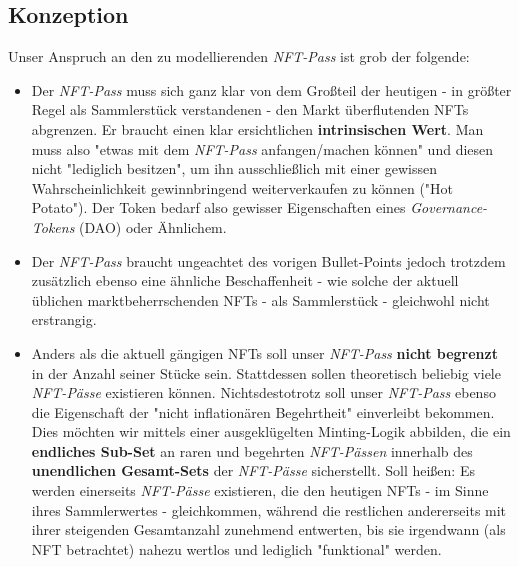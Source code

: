 
\subsection{Konzeption}

\vspace{0.3cm}

Unser Anspruch an den zu modellierenden \textit{NFT-Pass} ist grob der folgende:

\vspace{0.2cm}

\begin{itemize}
  \item Der \textit{NFT-Pass} muss sich ganz klar von dem Großteil der heutigen - in größter Regel als Sammlerstück verstandenen - den Markt überflutenden NFTs abgrenzen. Er braucht einen klar ersichtlichen \textbf{intrinsischen Wert}. Man muss also "etwas mit dem \textit{NFT-Pass} anfangen/machen können" und diesen nicht "lediglich besitzen", um ihn ausschließlich mit einer gewissen Wahrscheinlichkeit gewinnbringend weiterverkaufen zu können ("Hot Potato"). Der Token bedarf also gewisser Eigenschaften eines \textit{Governance-Tokens} (DAO) oder Ähnlichem.
  \item 
  \begin{sloppypar}  
  Der \textit{NFT-Pass} braucht ungeachtet des vorigen Bullet-Points jedoch trotzdem zusätzlich ebenso eine ähnliche Beschaffenheit - wie solche der aktuell üblichen marktbeherrschenden NFTs - als Sammlerstück - gleichwohl nicht erstrangig. 
  \end{sloppypar}
  \item Anders als die aktuell gängigen NFTs soll unser \textit{NFT-Pass} \textbf{nicht begrenzt} in der Anzahl seiner Stücke sein. Stattdessen sollen theoretisch beliebig viele \textit{NFT-Pässe} existieren können. Nichtsdestotrotz soll unser \textit{NFT-Pass} ebenso die Eigenschaft der "nicht inflationären Begehrtheit" einverleibt bekommen. Dies möchten wir mittels einer ausgeklügelten Minting-Logik abbilden, die ein \textbf{endliches Sub-Set} an raren und begehrten \textit{NFT-Pässen} innerhalb des \textbf{unendlichen Gesamt-Sets} der \textit{NFT-Pässe} sicherstellt. Soll heißen: Es werden einerseits \textit{NFT-Pässe} exis\-tieren, die den heutigen NFTs - im Sinne ihres Sammlerwertes - gleichkommen, während die restlichen andererseits mit ihrer steigenden Gesamtanzahl zunehmend entwerten, bis sie irgendwann (als NFT betrachtet) nahezu wertlos und lediglich "funktional" werden.

\end{itemize}
